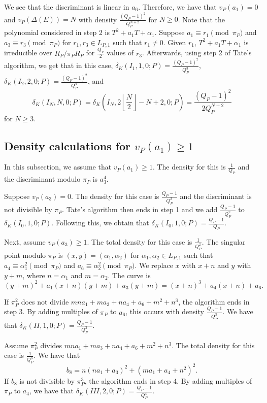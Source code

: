 \documentclass[12pt,letterpaper]{amsart}
\theoremstyle{definition}
\begin{document}
We see that the discriminant is linear in $a_6$. Therefore, we have that $v_P(a_1)=0$ and $v_P(\Delta(E))=N$ with density $\frac{(Q_P-1)^2}{Q_P^{N+2}}$ for $N\geq 0$. Note that the polynomial considered in step 2 is $T^2+a_1T+\alpha_1$. Suppose $a_1\equiv r_1\pmod{\pi_P}$ and $a_3\equiv r_3\pmod{\pi_P}$ for $r_1, r_3\in L_{P,1}$ such that $r_1\not=0$. Given $r_1$, $T^2+a_1T+\alpha_1$ is irreducible over $R_P/\pi_PR_P$ for $\frac{Q_P}{2}$ values of $r_3$. Afterwards, using step 2 of Tate's algorithm, we get that in this case, $\delta_K(I_1,1,0;P)=\frac{(Q_P-1)^2}{Q_P^3}$, $\delta_K(I_2,2,0;P)=\frac{(Q_P-1)^2}{Q_P^4}$, and 
\[
\delta_K(I_N,N,0;P)=\delta_K\left(I_N,2\left\lfloor\frac{N}{2}\right\rfloor-N+2,0;P\right)=\frac{(Q_P-1)^2}{2Q_P^{N+2}}
\]
for $N\geq 3$. 

\subsection{Density calculations for \texorpdfstring{$v_P(a_1)\geq 1$}{}}

In this subsection, we assume that $v_P(a_1)\geq 1$. The density for this is $\frac{1}{Q_P}$ and the discriminant modulo $\pi_P$ is $a_3^4$. 

Suppose $v_P(a_3)=0$. The density for this case is $\frac{Q_P-1}{Q_P^2}$ and the discriminant is not divisible by $\pi_P$. Tate's algorithm then ends in step 1 and we add $\frac{Q_P-1}{Q_P^2}$ to $\delta_K(I_0,1,0;P)$. Following this, we obtain that $\delta_K(I_0,1,0;P)=\frac{Q_P-1}{Q_P}$.

Next, assume $v_P(a_3)\geq 1$. The total density for this case is $\frac{1}{Q_P^2}$. The singular point modulo $\pi_P$ is $(x,y)=(\alpha_1, \alpha_2)$ for $\alpha_1, \alpha_2\in L_{P, 1}$ such that $a_4\equiv\alpha_1^2\pmod{\pi_P}$ and $a_6\equiv\alpha_2^2\pmod{\pi_P}$. We replace $x$ with $x+n$ and $y$ with $y+m$, where $n=\alpha_1$ and $m=\alpha_2$. The curve is
\[
(y+m)^2+a_1(x+n)(y+m)+a_3(y+m)=(x+n)^3+a_4(x+n)+a_6.
\]

If $\pi_P^2$ does not divide $mna_1+ma_3+na_4+a_6+m^2+n^3$, the algorithm ends in step 3. By adding multiples of $\pi_P$ to $a_6$, this occurs with density $\frac{Q_P-1}{Q_P^3}$. We have that $\delta_K(II,1,0;P)=\frac{Q_P-1}{Q_P^3}$.

Assume $\pi_P^2$ divides $mna_1+ma_3+na_4+a_6+m^2+n^3$. The total density for this case is $\frac{1}{Q_P^3}$. We have that
\[
b_8=n(n a_1+a_3)^2+(m a_1+a_4+n^2)^2.
\]
If $b_8$ is not divisible by $\pi_P^3$, the algorithm ends in step 4. By adding multiples of $\pi_P$ to $a_4$, we have that $\delta_K(III,2,0;P)=\frac{Q_P-1}{Q_P^4}$.
\end{document}
